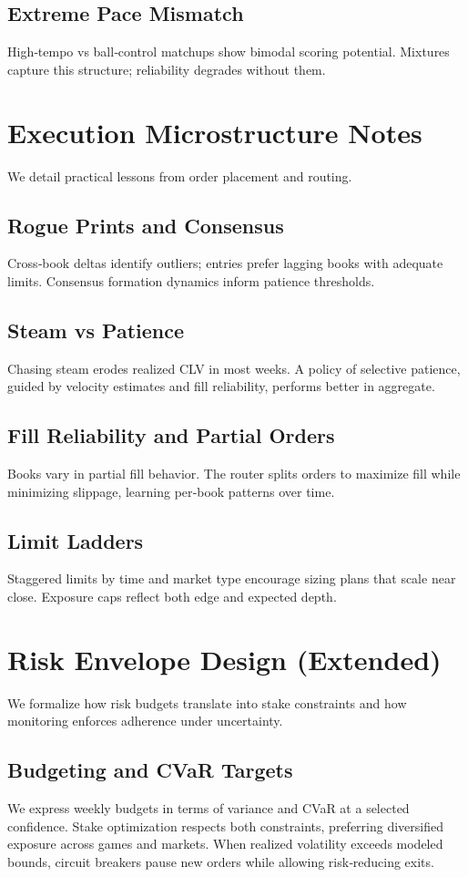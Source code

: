 \documentclass[12pt]{report}  %
\numberwithin{equation}{section}
\theoremstyle{plain}
\theoremstyle{definition}
\theoremstyle{remark}
\begin{document}
\section{Extreme Pace Mismatch}
High‑tempo vs ball‑control matchups show bimodal scoring potential. Mixtures capture this structure; reliability degrades without them.

\chapter{Execution Microstructure Notes}
We detail practical lessons from order placement and routing.

\section{Rogue Prints and Consensus}
Cross‑book deltas identify outliers; entries prefer lagging books with adequate limits. Consensus formation dynamics inform patience thresholds.

\section{Steam vs Patience}
Chasing steam erodes realized CLV in most weeks. A policy of selective patience, guided by velocity estimates and fill reliability, performs better in aggregate.

\section{Fill Reliability and Partial Orders}
Books vary in partial fill behavior. The router splits orders to maximize fill while minimizing slippage, learning per‑book patterns over time.

\section{Limit Ladders}
Staggered limits by time and market type encourage sizing plans that scale near close. Exposure caps reflect both edge and expected depth.

\chapter{Risk Envelope Design (Extended)}
We formalize how risk budgets translate into stake constraints and how monitoring enforces adherence under uncertainty.

\section{Budgeting and CVaR Targets}
We express weekly budgets in terms of variance and CVaR at a selected confidence. Stake optimization respects both constraints, preferring diversified exposure across games and markets. When realized volatility exceeds modeled bounds, circuit breakers pause new orders while allowing risk‑reducing exits.
\end{document}
